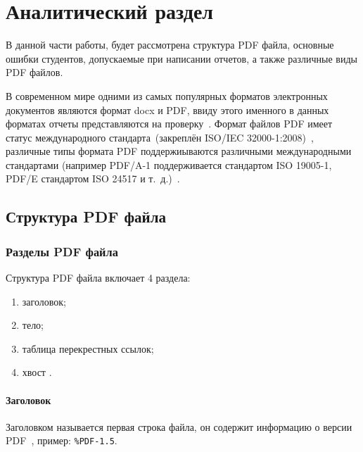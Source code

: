 \chapter{Аналитический раздел}
В данной части работы, будет рассмотрена структура PDF файла, основные ошибки студентов, допускаемые при написании отчетов,
а также различные виды PDF файлов.

В современном мире одними из самых популярных форматов электронных документов являются формат docx и PDF, ввиду этого именного в данных форматах отчеты представляются на проверку~\cite{pdf_pop}.
Формат файлов PDF имеет статус международного  стандарта~(закреплён ISO/IEC 32000-1:2008)~\cite{pdf_iso}, различные типы формата PDF поддержиываются различными международными стандартами (например PDF/A-1 поддерживается стандартом ISO 19005-1, PDF/E стандартом ISO 24517 и т.~д.)~\cite{pdf_iso_e,pdf_iso_a}.

\section{Структура PDF файла}


\subsection{Разделы PDF файла}
Структура PDF файла включает 4 раздела:
\begin{enumerate}
	\item заголовок;
	\item тело;
	\item таблица перекрестных ссылок;
	\item хвост \cite{pdf_object_def}.
\end{enumerate}

\subsubsection{Заголовок}
Заголовком называется первая строка файла, он содержит информацию о версии PDF~\cite{pdf_object_def}, пример: \texttt{\%PDF-1.5}.


